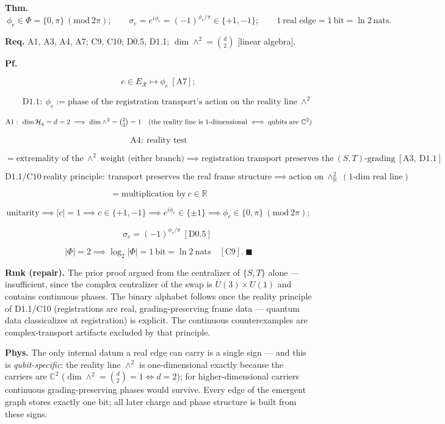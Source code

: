 \begin{theorem}\label{tag:CT0-9}
\textbf{Thm.} $\ \phi_e\in\Phi=\{0,\pi\}\ (\mathrm{mod}\ 2\pi);\qquad\sigma_e=e^{i\phi_e}=(-1)^{\phi_e/\pi}\in\{+1,-1\};\qquad 1\ \text{real edge}=1\ \text{bit}=\ln2\ \text{nats}.$

\textbf{Req.} A1, A3, A4, A7; C9, C10; D0.5, D1.1; $\dim\wedge^2=\binom{d}{2}$ [linear algebra].

\textbf{Pf.}

\[
e\in E_{\mathcal R}\mapsto\phi_e\ [\mathrm{A7}];
\]

\[
\qquad \mathrm{D1.1}:\ \phi_e:=\text{phase of the registration transport's action on the reality line}\ \wedge^2
\]

\[
\mathrm{A1}:\ \dim\mathcal H_q=d=2\implies\dim\wedge^2=\tbinom{2}{2}=1\quad(\text{the reality line is 1-dimensional}\iff\text{qubits are}\ \mathbb C^2)
\]

\[
\mathrm{A4}:\ \text{reality test}
\]

\[
= \text{extremality of the}\ \wedge^2\ \text{weight (either branch)}\implies\text{registration transport preserves the}\ (S,T)\text{-grading}\ [\mathrm{A3},\ \mathrm{D1.1}]
\]

\[
\mathrm{D1.1}/\mathrm{C10}\ \text{reality principle}:\ \text{transport preserves the real frame structure}\implies\text{action on}\ \wedge^2_{\mathbb R}\ (1\text{-dim real line})
\]

\[
= \text{multiplication by}\ c\in\mathbb R
\]

\[
\text{unitarity}\implies|c|=1\implies c\in\{+1,-1\}\implies e^{i\phi_e}\in\{\pm1\}\implies\phi_e\in\{0,\pi\}\ (\mathrm{mod}\ 2\pi);
\]

\[
\qquad \sigma_e=(-1)^{\phi_e/\pi}\ [\mathrm{D0.5}]
\]

\[
|\Phi|=2\implies\log_2|\Phi|=1\ \text{bit}=\ln2\ \text{nats}\quad[\mathrm{C9}].\ \blacksquare
\]

\textbf{Rmk (repair).} The prior proof argued from the centralizer of $\{S,T\}$ alone — insufficient, since the complex centralizer of the swap is $U(3)\times U(1)$ and contains continuous phases. The binary alphabet follows once the reality principle of D1.1/C10 (registrations are real, grading-preserving frame data — quantum data classicalizes at registration) is explicit. The continuous counterexamples are complex-transport artifacts excluded by that principle.

\textbf{Phys.} The only internal datum a real edge can carry is a single sign — and this is \textit{qubit-specific}: the reality line $\wedge^2$ is one-dimensional exactly because the carriers are $\mathbb C^2$ ($\dim\wedge^2=\binom d2=1\iff d=2$); for higher-dimensional carriers continuous grading-preserving phases would survive. Every edge of the emergent graph stores exactly one bit; all later charge and phase structure is built from these signs.

\end{theorem}

